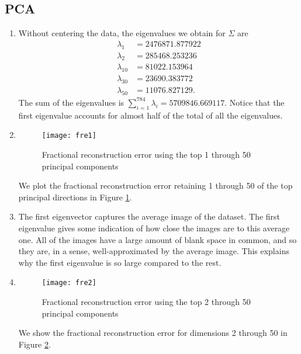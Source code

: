 \documentclass{article}
\begin{document}
\subsection{PCA}
\begin{enumerate}
	\item Without centering the data, the eigenvalues we obtain for $\Sigma$ are 
	\begin{align*}
		\lambda_1 &= 2476871.877922\\
		\lambda_2 &= 285468.253236\\
		\lambda_{10} &= 81022.153964\\
		\lambda_{30} &= 23690.383772\\
		\lambda_{50} &= 11076.827129.
	\end{align*}
	The sum of the eigenvalues is $\sum^{784}_{i=1}\lambda_i = 5709846.669117$. Notice that the first eigenvalue accounts for almost half of the total of all the eigenvalues.
	\item
	\begin{figure}
        \centering
        \texttt{[image: fre1]}
        \caption{Fractional reconstruction error using the top 1 through 50 principal components} 
        \label{fig:fre1}
    \end{figure}
	We plot the fractional reconstruction error retaining 1 through 50 of the top principal directions in Figure \ref{fig:fre1}.
	\item The first eigenvector captures the average image of the dataset. The first eigenvalue gives some indication of how close the images are to this average one. All of the images have a large amount of blank space in common, and so they are, in a sense, well-approximated by the average image. This explains why the first eigenvalue is so large compared to the rest.
	\item 
	\begin{figure}
        \centering
        \texttt{[image: fre2]}
        \caption{Fractional reconstruction error using the top 2 through 50 principal components} 
        \label{fig:fre2}
    \end{figure}
    We show the fractional reconstruction error for dimensions 2 through 50 in Figure \ref{fig:fre2}.
\end{enumerate}
\end{document}
